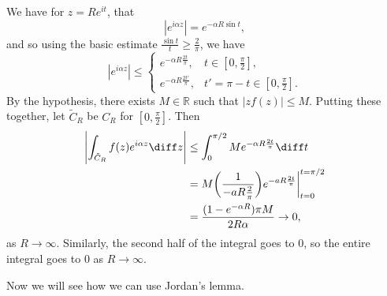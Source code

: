 \documentclass[12pt]{article}
\begin{document}
\begin{proofbox}
	We have for $z = Re^{i t}$, that
	\[
	|e^{i\alpha z}| = e^{-\alpha R \sin t},
	\]
	and so using the basic estimate $\frac{\sin t}{t} \ge \frac{2}{\pi}$, we have
	\[
	|e^{i\alpha z}|\le
	\begin{cases}
		e^{-\alpha R \frac{2 t}{\pi}}, & t \in [0, \frac{\pi}{2}],\\
		e^{-\alpha R \frac{2t'}{\pi}}, & t' = \pi-t \in [0, \frac{\pi}{2}].
	\end{cases}
	\]
	By the hypothesis, there exists $M \in \mathbb{R}$ such that $|zf(z)| \le M$. Putting these together, let $\tilde C_R$ be $C_R$ for $[0, \frac{\pi}{2}]$. Then
	\begin{align*}
		\Biggl| \int_{\tilde C_R} f(z) e^{i \alpha z} \diff z \Biggr| &\le \int_0^{\pi/2} M e^{-\alpha R \frac{2t}{\pi}} \diff t \\
									      &= M \biggl( \frac{1}{- a R \frac{2}{\pi}} \biggr) e^{-aR \frac{2t}{\pi}} \biggr|_{t = 0}^{t = \pi/2} \\
									      &= \frac{(1 - e^{-\alpha R})\pi M}{2 R \alpha} \to 0,
	\end{align*}
	as $R \to \infty$. Similarly, the second half of the integral goes to $0$, so the entire integral goes to $0$ as $R \to \infty$.
\end{proofbox}

Now we will see how we can use Jordan's lemma.
\end{document}
